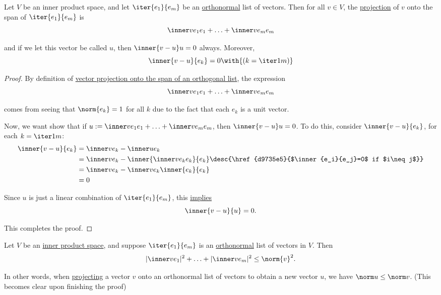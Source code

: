 \label{ac79275}

Let $V$ be an inner product space, and let $\iter{e_1}{e_m}$ be an
\href{d90fcb1}{orthonormal} list of vectors. Then for all $v\in V$, the
\href{e06bd2f}{projection} of $v$ onto the span of $\iter{e_1}{e_m}$ is
$$
  \inner v{e_1}e_1+\ldots+\inner v{e_m}e_m
$$

and if we let this vector be called $u$, then $\inner{v-u}u=0$ always.
Moreover,
$$
  \inner{v-u}{e_k}=0\with{(k=\iter1m)}
$$

\begin{proof}
  By definition of \href{e06bd2f}{vector projection onto the span of an
  orthogonal list}, the expression
  \begin{equation*}
    \inner v{e_1}e_1+\ldots+\inner v{e_m}e_m
  \end{equation*}

  comes from seeing that $\norm{e_k}=1$ for all $k$ due to the fact that each
  $e_k$ is a unit vector.

  Now, we want show that if $u:=\inner v{e_1}e_1+\ldots+\inner v{e_m}e_m$, then
  $\inner{v-u}u=0$. To do this, consider $\inner{v-u}{e_k}$, for each
  $k=\iter1m$:
  \begin{align*}
    \inner{v-u}{e_k} &=\inner v{e_k}-\inner u{e_k}                                                                         \\
                     &=\inner v{e_k}-\inner{\inner v{e_k}e_k}{e_k}\desc{\href{d9735e5}{$\inner{e_i}{e_j}=0$ if $i\neq j$}} \\
                     &=\inner v{e_k}-\inner v{e_k}\inner{e_k}{e_k}                                                         \\
                     &=0
  \end{align*}

  Since $u$ is just a linear combination of $\iter{e_1}{e_m}$, this
  \href{fb218c8}{implies}
  $$
    \inner{v-u}{u}=0.
  $$

  This completes the proof.
\end{proof}

\label{d845284}

Let $V$ be an \href{b9935c8}{inner product space}, and suppose
$\iter{e_1}{e_m}$ is an \href{d90fcb1}{orthonormal} list of vectors in $V$.
Then
$$
  |\inner v{e_1}|^2+\ldots+|\inner v{e_m}|^2\leq\norm{v}^2.
$$

In other words, when \href{e06bd2f}{projecting} a vector $v$ onto an
orthonormal list of vectors to obtain a new vector $u$, we have $\norm
u\leq\norm v$. (This becomes clear upon finishing the proof)

